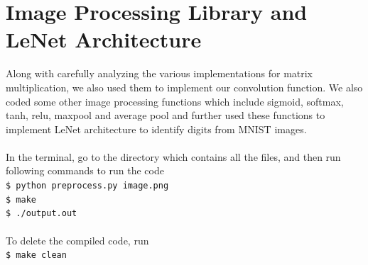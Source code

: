 \documentclass{article}
\begin{document}
\section*{Image Processing Library and LeNet Architecture}
Along with carefully analyzing the various implementations for matrix multiplication, we also used them to implement our convolution function. We also coded some other image processing functions which include sigmoid, softmax, tanh, relu, maxpool and average pool and further used these functions to implement LeNet architecture to identify digits from MNIST images.\\
\\
In the terminal, go to the directory which contains all the files, and then run following commands to run the code\\
\texttt{\$ python preprocess.py image.png}
\\\texttt{\$ make}
\\\texttt{\$ ./output.out}
\\
\\
To delete the compiled code, run\\
\texttt{\$ make clean}



\end{document}
